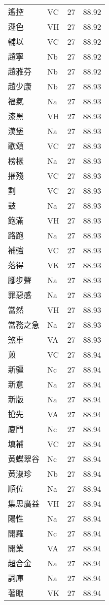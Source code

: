 \documentclass[twocolumn]{book}
\begin{document}
\begin{supertabular}{llrr}
遙控 & VC & 27 &  88.92\\
遜色 & VH & 27 &  88.92\\
輔以 & VC & 27 &  88.92\\
趙寧 & Nb & 27 &  88.92\\
趙雅芬 & Nb & 27 &  88.92\\
趙少康 & Nb & 27 &  88.93\\
福氣 & Na & 27 &  88.93\\
漆黑 & VH & 27 &  88.93\\
漢堡 & Na & 27 &  88.93\\
歌頌 & VC & 27 &  88.93\\
榜樣 & Na & 27 &  88.93\\
摧殘 & VC & 27 &  88.93\\
劃 & VC & 27 &  88.93\\
鼓 & Na & 27 &  88.93\\
飽滿 & VH & 27 &  88.93\\
路跑 & Na & 27 &  88.93\\
補強 & VC & 27 &  88.93\\
落得 & VK & 27 &  88.93\\
腳步聲 & Na & 27 &  88.93\\
罪惡感 & Na & 27 &  88.93\\
當然 & VH & 27 &  88.93\\
當務之急 & Na & 27 &  88.93\\
煞車 & VA & 27 &  88.93\\
煎 & VC & 27 &  88.94\\
新疆 & Nc & 27 &  88.94\\
新意 & Na & 27 &  88.94\\
新版 & Na & 27 &  88.94\\
搶先 & VA & 27 &  88.94\\
廈門 & Nc & 27 &  88.94\\
填補 & VC & 27 &  88.94\\
黃蝶翠谷 & Nc & 27 &  88.94\\
黃淑珍 & Nb & 27 &  88.94\\
順位 & Na & 27 &  88.94\\
集思廣益 & VH & 27 &  88.94\\
陽性 & Na & 27 &  88.94\\
開羅 & Nc & 27 &  88.94\\
開業 & VA & 27 &  88.94\\
超合金 & Na & 27 &  88.94\\
詞庫 & Na & 27 &  88.94\\
著眼 & VK & 27 &  88.94\\

\end{supertabular}
\end{document}
